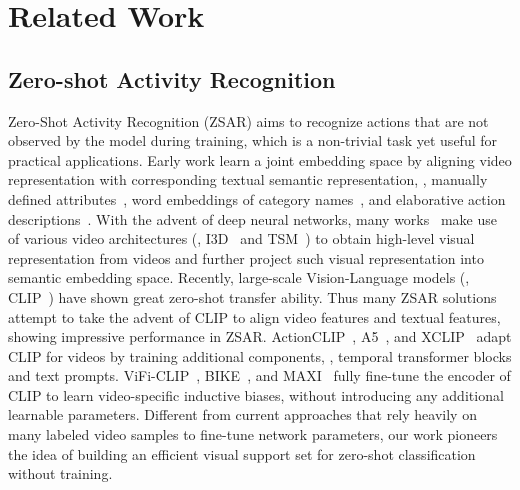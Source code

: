 \section{Related Work}
\label{Related Work}
\subsection{Zero-shot Activity Recognition}
Zero-Shot Activity Recognition (ZSAR) aims to recognize actions that are not observed by the model during training, which is a non-trivial task yet useful for practical applications. Early work learn a joint embedding space by aligning video representation with corresponding textual semantic representation, \eg, manually defined attributes~\cite{liu2011recognizing,zellers2017zero}, word embeddings of category names~\cite{qin2017zero,shao2020temporal}, and elaborative action descriptions~\cite{chen2021elaborative,qian2022rethinking}. With the advent of deep neural networks, many works~\cite{chen2021elaborative,lin2019tsm,lin2022cross} make use of various video architectures (\eg, I3D~\cite{carreira2017quo} and TSM~\cite{lin2019tsm}) to obtain high-level visual representation from videos and further project such visual representation into semantic embedding space. Recently, large-scale Vision-Language models (\eg, CLIP~\cite{radford2021learning}) have shown great zero-shot transfer ability. Thus many ZSAR solutions attempt to take the advent of CLIP to align video features and textual features, showing impressive performance in ZSAR. ActionCLIP~\cite{wang2021actionclip}, A5~\cite{ju2022prompting}, and XCLIP~\cite{XCLIP}  adapt CLIP for videos by training additional components, \eg, temporal transformer blocks and text prompts. ViFi-CLIP~\cite{hanoonavificlip}, BIKE~\cite{wu2023bidirectional}, and MAXI~\cite{lin2023match} fully fine-tune the encoder of CLIP to learn video-specific inductive biases, without introducing any additional learnable parameters. Different from current approaches that rely heavily on many labeled video samples to fine-tune network parameters, our work pioneers the idea of building an efficient visual support set for zero-shot classification without training. 

